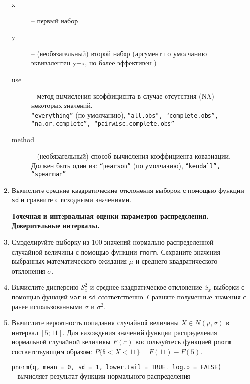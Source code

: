 \begin{enumerate}
\begin{mdframed}[style=BadassFrame]
\begin{description}
                \item[x] -- первый набор
                \item[y] -- (необязательный) второй набор (аргумент по умолчанию эквивалентен y=x, но более эффективен )
                \item[use] -- метод вычисления коэффициента в случае отсутствия (NA) некоторых значений. \\
                     \texttt{``everything''} (по умолчанию),  \texttt{``all.obs", ``complete.obs'', ``na.or.complete'', ``pairwise.complete.obs''}
                \item[method] -- (необязательный) способ вычисления коэффициента ковариации. Должен быть один из: 
                     \texttt{``pearson''} (по умолчанию), \texttt{``kendall'', ``spearman''}
              \end{description}
          \end{mdframed}

    \item Вычислите средние квадратические отклонения выборок с помощью функции \texttt{sd} и сравните
          с исходными значениями.


    \textbf{Точечная и интервальная оценки параметров распределения. Доверительные интервалы.}

    \item Смоделируйте выборку из 100 значений нормально распределенной случайной величины с помощью
          функции \texttt{rnorm}. Сохраните значения выбранных математического ожидания $\mu$ и 
          среднего квадратического отклонения $\sigma$.

    \item Вычислите дисперсию $S_x^2$ и среднее квадратическое отклонение $S_x$ выборки с помощью 
          функций \texttt{var} и \texttt{sd} соответственно. Сравните полученные значения с ранее использованными 
          $\sigma$ и $\sigma^2$.

    \item Вычислите вероятность попадания случайной величины $X \in N(\mu, \sigma)$ в интервал $[5;11]$. Для нахождения значений функции распределения
          нормальной случайной величины $F(x)$ воспользуйтесь функцией \texttt{pnorm} соответствующим образом: $P\{5<X<11\}=F(11)-F(5)$.

          \begin{mdframed}[style=BadassFrame]

              \texttt{pnorm(q, mean = 0, sd = 1, lower.tail = TRUE, log.p = FALSE)} \\
                -- вычисляет результат функции нормального распределения
              \begin{description}


\end{description}
\end{mdframed}
\end{enumerate}
